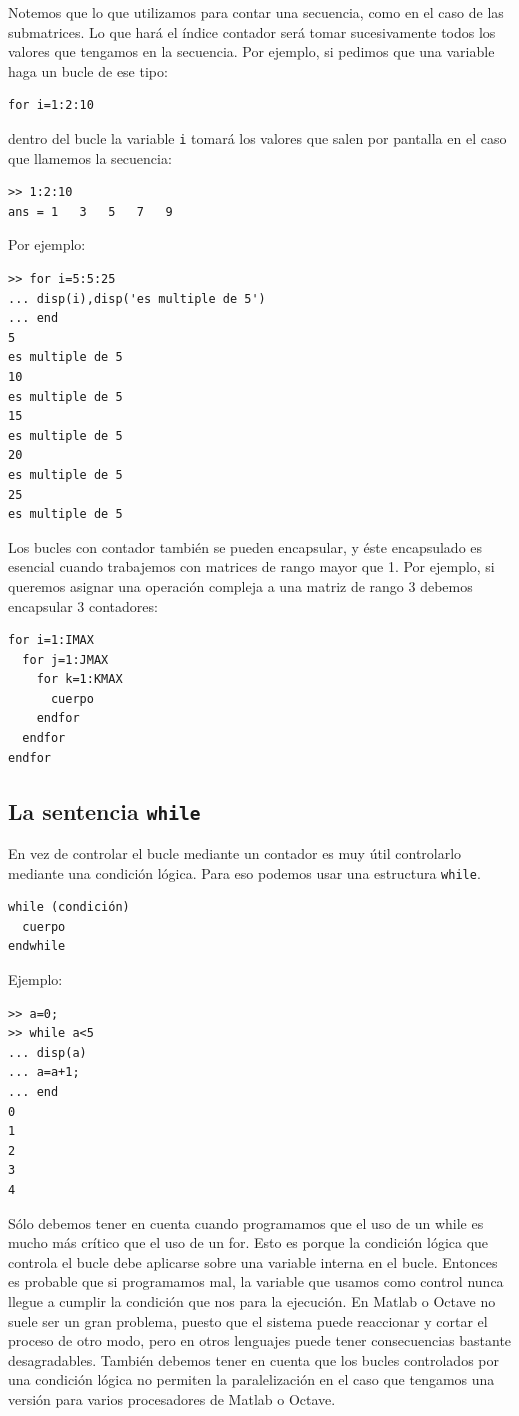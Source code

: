 Notemos que lo que utilizamos para contar una secuencia, como en el
caso de las submatrices. Lo que hará el índice contador será tomar
sucesivamente todos los valores que tengamos en la secuencia. Por
ejemplo, si pedimos que una variable haga un bucle de ese tipo:

\begin{verbatim}
for i=1:2:10
\end{verbatim}
dentro del bucle la variable \texttt{i} tomará los valores que salen
por pantalla en el caso que llamemos la secuencia:

\begin{verbatim}
>> 1:2:10
ans = 1   3   5   7   9
\end{verbatim}

Por ejemplo:
\begin{verbatim}
>> for i=5:5:25
... disp(i),disp('es multiple de 5')
... end
5
es multiple de 5
10
es multiple de 5
15
es multiple de 5
20
es multiple de 5
25
es multiple de 5
\end{verbatim}


Los bucles con contador también se pueden encapsular, y éste
encapsulado es esencial cuando trabajemos con matrices de rango
mayor que 1. Por ejemplo, si queremos asignar una operación compleja a
una matriz de rango 3 debemos encapsular 3 contadores:

\begin{verbatim}
for i=1:IMAX   
  for j=1:JMAX   
    for k=1:KMAX   
      cuerpo   
    endfor   
  endfor   
endfor
\end{verbatim}


\subsection{La sentencia \texttt{while}}

En vez de controlar el bucle mediante un contador es muy útil
controlarlo mediante una condición lógica. Para eso podemos usar una
estructura \texttt{while}.

\begin{verbatim}
while (condición)   
  cuerpo   
endwhile
\end{verbatim}

Ejemplo:
\begin{verbatim}
>> a=0;
>> while a<5
... disp(a)
... a=a+1;
... end
0
1
2
3
4
\end{verbatim}

Sólo debemos tener en cuenta cuando programamos que el uso de un while
es mucho más crítico que el uso de un for. Esto es porque la condición
lógica que controla el bucle debe aplicarse sobre una variable interna
en el bucle. Entonces es probable que si programamos mal, la variable
que usamos como control nunca llegue a cumplir la condición que nos
para la ejecución. En Matlab o Octave no suele ser un gran problema,
puesto que el sistema puede reaccionar y cortar el proceso de otro
modo, pero en otros lenguajes puede tener consecuencias bastante
desagradables.  También debemos tener en cuenta que los bucles
controlados por una condición lógica no permiten la paralelización en
el caso que tengamos una versión para varios procesadores de Matlab o
Octave.


